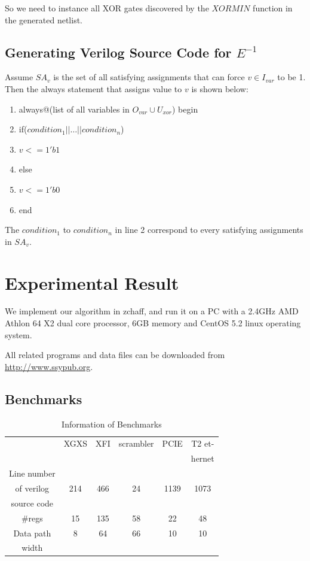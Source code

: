 \documentclass[journal]{IEEEtran}
\begin{document}
So we need to instance all XOR gates discovered by the $XORMIN$ function in the generated netlist.

\subsection{Generating Verilog Source Code for $E^{-1}$}
Assume $SA_v$ is the set of all satisfying assignments that can force $v\in I_{var}$ to be 1.
Then the always statement that assigns value to $v$ is shown below:
\begin{enumerate}
\item always@(list of all variables in $O_{var}\cup U_{xor}$) begin
\item \hspace{0.3cm}if($condition_1 || \dots || condition_n$)
\item \hspace{0.6cm} $v<=1'b1$
\item \hspace{0.3cm}else
\item \hspace{0.6cm} $v<=1'b0$
\item end
\end{enumerate}

The $condition_1$ to $condition_n$ in line 2 correspond to every satisfying assignments in $SA_v$.

\section{Experimental Result}\label{sec_exp}
We implement our algorithm in zchaff\cite{CHAFF},
and run it on a PC with a 2.4GHz AMD Athlon 64 X2 dual core processor, 6GB memory and CentOS 5.2 linux operating system.

All related programs and data files can be downloaded from \url{http://www.ssypub.org}.
\subsection{Benchmarks}
\begin{table}[!t]
\centering
\caption{Information of Benchmarks}
\begin{tabular}{|c|c|c|c|c|c|}
\hline
&XGXS&XFI&scrambler&PCIE&T2 et-\\
&&&&&hernet\\\hline
Line number&&&&&\\
of verilog&214&466&24&1139&1073\\
source code&&&&&\\\hline
\#regs&15&135&58&22&48\\\hline
Data path&8&64&66&10&10\\
width&&&&&\\ \hline
\end{tabular}
\end{table}
\end{document}
